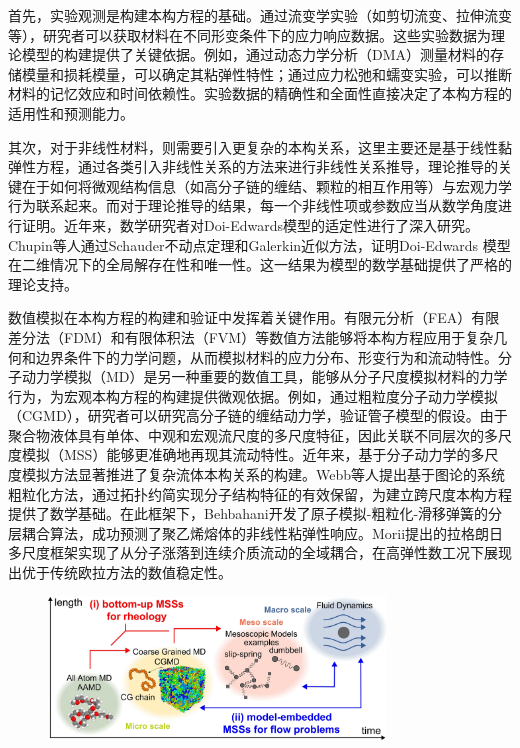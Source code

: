 首先，实验观测是构建本构方程的基础。通过流变学实验（如剪切流变、拉伸流变等），研究者可以获取材料在不同形变条件下的应力响应数据。这些实验数据为理论模型的构建提供了关键依据。例如，通过动态力学分析（DMA）测量材料的存储模量和损耗模量，可以确定其粘弹性特性；通过应力松弛和蠕变实验，可以推断材料的记忆效应和时间依赖性。实验数据的精确性和全面性直接决定了本构方程的适用性和预测能力\cite{alvesNumericalMethodsViscoelastic2021,stadlerWhatAreTypical2014}。

其次，对于非线性材料，则需要引入更复杂的本构关系，这里主要还是基于线性黏弹性方程，通过各类引入非线性关系的方法来进行非线性关系推导，理论推导的关键在于如何将微观结构信息（如高分子链的缠结、颗粒的相互作用等）与宏观力学行为联系起来。而对于理论推导的结果，每一个非线性项或参数应当从数学角度进行证明\cite{zhai2024global}。近年来，数学研究者对Doi-Edwards模型的适定性进行了深入研究。Chupin等人通过Schauder不动点定理和Galerkin近似方法，证明Doi-Edwards 模型在二维情况下的全局解存在性和唯一性\cite{hassager2010constitutive}。这一结果为模型的数学基础提供了严格的理论支持。

数值模拟在本构方程的构建和验证中发挥着关键作用。有限元分析（FEA）有限差分法（FDM）和有限体积法（FVM）等数值方法能够将本构方程应用于复杂几何和边界条件下的力学问题，从而模拟材料的应力分布、形变行为和流动特性\cite{alvesNumericalMethodsViscoelastic2021}。分子动力学模拟（MD）是另一种重要的数值工具，能够从分子尺度模拟材料的力学行为，为宏观本构方程的构建提供微观依据。例如，通过粗粒度分子动力学模拟（CGMD），研究者可以研究高分子链的缠结动力学，验证管子模型的假设\cite{li2023coupling,sgouros2017slip}。由于聚合物液体具有单体、中观和宏观流尺度的多尺度特征，因此关联不同层次的多尺度模拟（MSS）能够更准确地再现其流动特性\cite{satoRecentDevelopmentsMultiscale2024}。近年来，基于分子动力学的多尺度模拟方法显著推进了复杂流体本构关系的构建。Webb等人提出基于图论的系统粗粒化方法，通过拓扑约简实现分子结构特征的有效保留，为建立跨尺度本构方程提供了数学基础\cite{webb2018graph}。在此框架下，Behbahani开发了原子模拟-粗粒化-滑移弹簧的分层耦合算法，成功预测了聚乙烯熔体的非线性粘弹性响应\cite{behbahani2021dynamics}。Morii提出的拉格朗日多尺度框架实现了从分子涨落到连续介质流动的全域耦合，在高弹性数工况下展现出优于传统欧拉方法的数值稳定性\cite{morii2021lagrangian}。
\begin{figure}[htbp]
	\centering
	\includegraphics[width=0.8\textwidth]{Fig/duochidumoni.png}
\end{figure}

